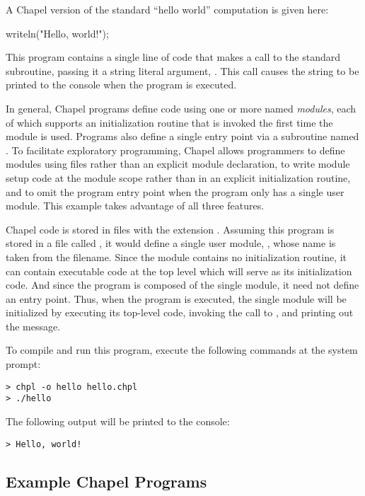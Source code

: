 A Chapel version of the standard ``hello world'' computation is given
here:
\begin{chapel}
writeln("Hello, world!");
\end{chapel}
\noindent This program contains a single line of code that makes a
call to the standard  subroutine, passing it a string
literal argument, .  This call causes the string
to be printed to the console when the program is executed.

In general, Chapel programs define code using one or more named
\emph{modules}, each of which supports an initialization routine that
is invoked the first time the module is used.  Programs also define a
single entry point via a subroutine named .  To facilitate
exploratory programming, Chapel allows programmers to define modules
using files rather than an explicit module declaration, to write
module setup code at the module scope rather than in an explicit
initialization routine, and to omit the program entry point when the
program only has a single user module.  This example takes advantage
of all three features.

Chapel code is stored in files with the extension .
Assuming this program is stored in a file called , it
would define a single user module, , whose name is taken
from the filename.  Since the module contains no initialization
routine, it can contain executable code at the top level which will
serve as its initialization code.  And since the program is composed
of the single  module, it need not define an entry point.
Thus, when the program is executed, the single  module
will be initialized by executing its top-level code, invoking the call
to , and printing out the message.

To compile and run this program, execute the following commands at the
system prompt:
\small{
\begin{verbatim} 
> chpl -o hello hello.chpl
> ./hello
\end{verbatim}}
The following output will be printed to the console:
\small{
\begin{verbatim}
> Hello, world!
\end{verbatim}}

\subsection{Example Chapel Programs}

